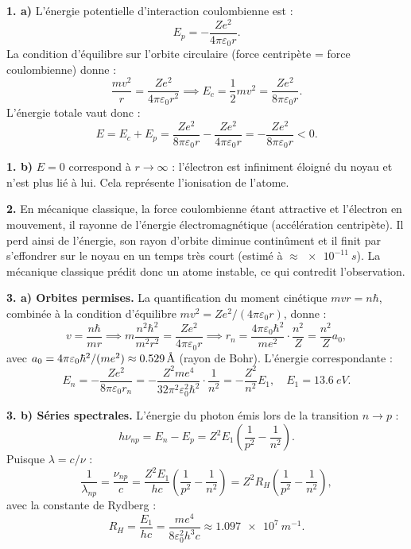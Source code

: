\documentclass[12pt,a4paper]{article}
\begin{document}
\begin{boitecorrige}
\textbf{1. a)} L'énergie potentielle d'interaction coulombienne est :
\[
  E_p = -\frac{Ze^2}{4\pi\varepsilon_0 r}.
\]
La condition d'équilibre sur l'orbite circulaire (force centripète = force coulombienne) donne :
\[
  \frac{mv^2}{r} = \frac{Ze^2}{4\pi\varepsilon_0 r^2}
  \implies E_c = \frac{1}{2}mv^2 = \frac{Ze^2}{8\pi\varepsilon_0 r}.
\]
L'énergie totale vaut donc :
\[
  \boxed{E = E_c + E_p = \frac{Ze^2}{8\pi\varepsilon_0 r} - \frac{Ze^2}{4\pi\varepsilon_0 r}
          = -\frac{Ze^2}{8\pi\varepsilon_0 r} < 0.}
\]

\textbf{1. b)} $E = 0$ correspond à $r\to\infty$ : l'électron est infiniment éloigné du noyau et
n'est plus lié à lui. Cela représente l'ionisation de l'atome.

\textbf{2.} En mécanique classique, la force coulombienne étant attractive et l'électron en
mouvement, il rayonne de l'énergie électromagnétique (accélération centripète). Il perd ainsi de
l'énergie, son rayon d'orbite diminue continûment et il finit par s'effondrer sur le noyau en un
temps très court (estimé à $\approx \qty{e-11}{s}$). La mécanique classique prédit donc un atome
instable, ce qui contredit l'observation.

\textbf{3. a) Orbites permises.}
La quantification du moment cinétique $mvr = n\hbar$, combinée à la condition d'équilibre
$mv^2 = Ze^2/(4\pi\varepsilon_0 r)$, donne :
\[
  v = \frac{n\hbar}{mr} \implies m\frac{n^2\hbar^2}{m^2r^2} = \frac{Ze^2}{4\pi\varepsilon_0 r}
  \implies r_n = \frac{4\pi\varepsilon_0\hbar^2}{me^2}\cdot\frac{n^2}{Z} = \frac{n^2}{Z}a_0,
\]
avec $a_0 = 4\pi\varepsilon_0\hbar^2/(me^2) \approx \num{0.529}\,\text{\AA}$ (rayon de Bohr).
L'énergie correspondante :
\[
  \boxed{E_n = -\frac{Ze^2}{8\pi\varepsilon_0 r_n} = -\frac{Z^2 me^4}{32\pi^2\varepsilon_0^2\hbar^2}
              \cdot\frac{1}{n^2} = -\frac{Z^2}{n^2}E_1, \quad E_1 = \qty{13.6}{eV}.}
\]

\textbf{3. b) Séries spectrales.}
L'énergie du photon émis lors de la transition $n\to p$ :
\[
  h\nu_{np} = E_n - E_p = Z^2E_1\!\left(\frac{1}{p^2}-\frac{1}{n^2}\right).
\]
Puisque $\lambda = c/\nu$ :
\[
  \frac{1}{\lambda_{np}} = \frac{\nu_{np}}{c} = \frac{Z^2E_1}{hc}\!\left(\frac{1}{p^2}-\frac{1}{n^2}\right)
  = Z^2R_H\!\left(\frac{1}{p^2}-\frac{1}{n^2}\right),
\]
avec la constante de Rydberg :
\[
  R_H = \frac{E_1}{hc} = \frac{me^4}{8\varepsilon_0^2 h^3 c}
      \approx \boxed{\qty{1.097e7}{m^{-1}}.}
\]
\end{boitecorrige}
\end{document}
